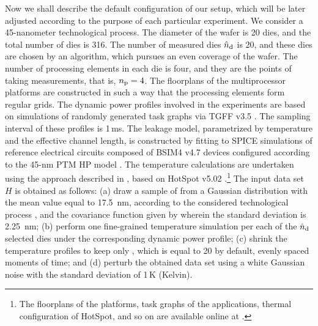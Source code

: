 Now we shall describe the default configuration of our setup, which will be
later adjusted according to the purpose of each particular experiment. We
consider a 45-nanometer technological process. The diameter of the wafer is 20
dies, and the total number of dies \nd is 316. The number of measured dies
${\hat{n}_\mathrm{d}}$ is 20, and these dies are chosen by an algorithm, which pursues an even
coverage of the wafer. The number of processing elements in each die is four,
and they are the points of taking measurements, that is, ${n_\mathrm{p}} = 4$. The
floorplans of the multiprocessor platforms are constructed in such a way that
the processing elements form regular grids. The dynamic power profiles involved
in the experiments are based on simulations of randomly generated task graphs
via TGFF v3.5 \cite{dick1998}. The sampling interval of these profiles is
1$\,$ms. The leakage model, parametrized by temperature and the effective
channel length, is constructed by fitting to SPICE simulations of reference
electrical circuits composed of BSIM4 v4.7 devices \cite{bsim} configured
according to the 45-nm PTM HP model \cite{ptm}. The temperature calculations are
undertaken using the approach described in \cite{ukhov2012}, based on HotSpot
v5.02 \cite{skadron2003}.\footnote{The floorplans of the platforms, task graphs
of the applications, thermal configuration of HotSpot, and so on are available
online at \cite{eslab2013}.} The input data set $H$ is obtained as follows: (a)
draw a sample of \g from a Gaussian distribution with the mean value equal to
17.5~nm, according to the considered technological process \cite{ptm}, and the
covariance function given by  wherein the standard
deviation is 2.25~nm; (b) perform one fine-grained temperature simulation per
each of the ${\hat{n}_\mathrm{d}}$ selected dies under the corresponding dynamic power profile;
(c) shrink the temperature profiles to keep only \ns, which is equal to 20 by
default, evenly spaced moments of time; and (d) perturb the obtained data set
using a white Gaussian noise with the standard deviation of 1$\,$K (Kelvin).

